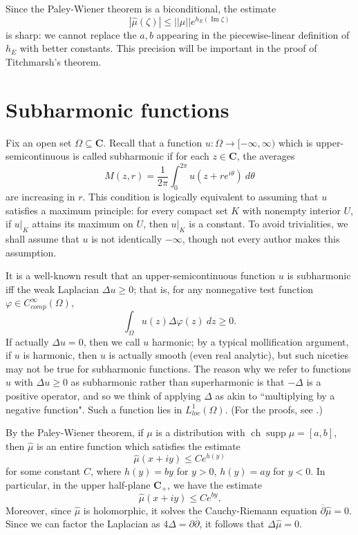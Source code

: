\documentclass[12pt]{report}
\newcommand{\CC}{\mathbf{C}}
\DeclareMathOperator{\ch}{ch}
\DeclareMathOperator{\supp}{supp}
\newcommand{\dbar}{\overline \partial}
\renewcommand{\Im}{\operatorname{Im}}
\theoremstyle{definition}
\begin{document}
    Since the Paley-Wiener theorem is a biconditional, the estimate
    $$|\hat \mu(\zeta)| \leq ||\mu|| e^{h_E(\Im \zeta)}$$
    is sharp: we cannot replace the $a, b$ appearing in the piecewise-linear definition of $h_E$ with better constants. This precision will be important in the proof of Titchmarsh's theorem.


\section{Subharmonic functions}
Fix an open set $\Omega \subseteq \CC$. Recall that a function $u: \Omega \to [-\infty, \infty)$ which is upper-semicontinuous is called subharmonic if for each $z \in \CC$, the averages
$$M(z, r) = \frac{1}{2\pi} \int_0^{2\pi} u(z + re^{i\theta}) ~d\theta$$
are increasing in $r$. This condition is logically equivalent to assuming that $u$ satisfies a maximum principle: for every compact set $K$ with nonempty interior $U$, if $u|_K$ attains its maximum on $U$, then $u|_K$ is a constant. To avoid trivialities, we shall assume that $u$ is not identically $-\infty$, though not every author makes this assumption.

It is a well-known result that an upper-semicontinuous function $u$ is subharmonic iff the weak Laplacian $\Delta u \geq 0$; that is, for any nonnegative test function $\varphi \in C^\infty_{comp}(\Omega)$,
$$\int_\Omega u(z) \Delta \varphi(z) ~dz \geq 0.$$ If actually $\Delta u = 0$, then we call $u$ harmonic; by a typical mollification argument, if $u$ is harmonic, then $u$ is actually smooth (even real analytic), but such niceties may not be true for subharmonic functions. The reason why we refer to functions $u$ with $\Delta u \geq 0$ as subharmonic rather than superharmonic is that $-\Delta$ is a positive operator, and so we think of applying $\Delta$ as akin to ``multiplying by a negative function". Such a function lies in $L^1_{loc}(\Omega)$. (For the proofs, see \cite[Chapter 1]{hormander1973introduction}.)

By the Paley-Wiener theorem, if $\mu$ is a distribution with $\ch \supp \mu = [a, b]$, then $\hat \mu$ is an entire function which satisfies the estimate
$$\hat \mu(x + iy) \leq Ce^{h(y)}$$
for some constant $C$, where $h(y) = by$ for $y > 0$, $h(y) = ay$ for $y < 0$. In particular, in the upper half-plane $\CC_+$, we have the estimate
$$\hat \mu(x + iy) \leq Ce^{by}.$$
Moreover, since $\hat \mu$ is holomorphic, it solves the Cauchy-Riemann equation $\dbar \hat \mu = 0$. Since we can factor the Laplacian as $4\Delta = \partial \dbar$, it follows that $\Delta \hat \mu = 0$.
\end{document}
